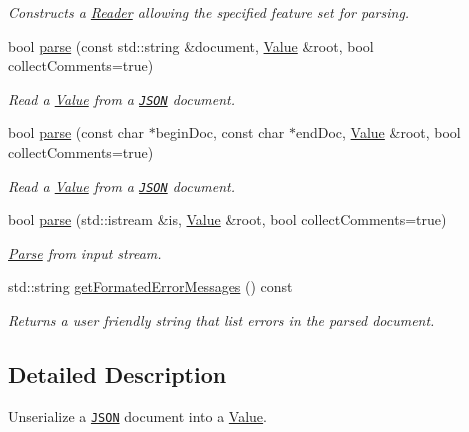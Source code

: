 \begin{DoxyCompactItemize}
\begin{DoxyCompactList}\small\item\em Constructs a \hyperlink{class_json_1_1_reader}{Reader} allowing the specified feature set for parsing. \end{DoxyCompactList}\item 
bool \hyperlink{class_json_1_1_reader_af1da6c976ad1e96c742804c3853eef94}{parse} (const std\+::string \&document, \hyperlink{class_json_1_1_value}{Value} \&root, bool collect\+Comments=true)
\begin{DoxyCompactList}\small\item\em Read a \hyperlink{class_json_1_1_value}{Value} from a \href{http://www.json.org}{\tt J\+S\+O\+N} document. \end{DoxyCompactList}\item 
bool \hyperlink{class_json_1_1_reader_ac71ef2b64c7c27b062052e692af3fb32}{parse} (const char $\ast$begin\+Doc, const char $\ast$end\+Doc, \hyperlink{class_json_1_1_value}{Value} \&root, bool collect\+Comments=true)
\begin{DoxyCompactList}\small\item\em Read a \hyperlink{class_json_1_1_value}{Value} from a \href{http://www.json.org}{\tt J\+S\+O\+N} document. \end{DoxyCompactList}\item 
bool \hyperlink{class_json_1_1_reader_a8d0347e6b47343e4bc68be7ecdb9c4e9}{parse} (std\+::istream \&is, \hyperlink{class_json_1_1_value}{Value} \&root, bool collect\+Comments=true)
\begin{DoxyCompactList}\small\item\em \hyperlink{struct_parse}{Parse} from input stream. \end{DoxyCompactList}\item 
std\+::string \hyperlink{class_json_1_1_reader_afa4a59e962d23c4d1c38b433fc95eefa}{get\+Formated\+Error\+Messages} () const 
\begin{DoxyCompactList}\small\item\em Returns a user friendly string that list errors in the parsed document. \end{DoxyCompactList}\end{DoxyCompactItemize}


\subsection{Detailed Description}
Unserialize a \href{http://www.json.org}{\tt J\+S\+O\+N} document into a \hyperlink{class_json_1_1_value}{Value}. 



